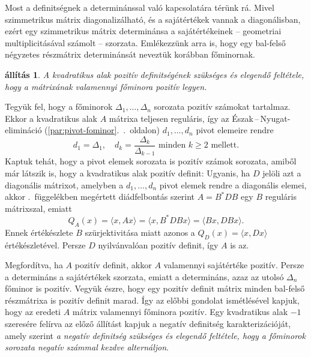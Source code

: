 \documentclass[a4paper, showtrims]{memoir}
\makeatletter
\renewenvironment{proof}[1][\proofname]
    {\par\pushQED{\qed}%
    \normalfont \topsep6\p@\@plus6\p@\relax
    \trivlist
    \item[\hskip\labelsep
        \itshape
    #1\@addpunct{:}]\ignorespaces}
    {\popQED\endtrivlist\@endpefalse}
\theoremstyle{plain}
\newtheorem{proposition}{állítás}[chapter]
\theoremstyle{remark}
\theoremstyle{definition}
\newcommand{\ip}[2]{\langle#1,#2\rangle}
\makeatother
\begin{document}
Most a definitségnek a determinánssal való kapcsolatára térünk rá.
Mivel szimmetrikus mátrix diagonalizálható, és a sajátértékek vannak a diagonálisban, ezért egy szimmetrikus mátrix determinánsa a sajátértékeinek -- geometriai multiplicitásával számolt -- szorzata.
Emlékezzünk arra is, hogy egy bal-felső négyzetes részmátrix determinánsát neveztük korábban főminornak.
\begin{proposition}
    A kvadratikus alak pozitív definitségének szükséges és elegendő feltétele,
    hogy a mátrixának valamennyi főminora pozitív legyen.
\end{proposition}
\begin{proof}
    Tegyük fel, hogy a főminorok $\Delta_1,\ldots,\Delta_n$ sorozata pozitív számokat tartalmaz.
    Ekkor a kvadratikus alak $A$ mátrixa teljesen reguláris, 
    így az Észak\,--\,Nyugat-elimináció 
    (\ref{par:pivot-fominor}.~\aazt{\pageref{par:pivot-fominor}}.~oldalon)
    $d_1,\dots,d_n$ pivot elemeire rendre
    \[
        d_1=\Delta_1,
        \quad
        d_k=\frac{\Delta_k}{\Delta_{k-1}}
        \text{ minden } k\geq 2 \text{ mellett.}
    \]
    Kaptuk tehát, hogy a pivot elemek sorozata is pozitív számok sorozata, 
    amiből már látszik is, hogy a kvadratikus alak pozitív definit:
    Ugyanis, ha $D$ jelöli azt a diagonális mátrixot, amelyben 
    a $d_1,\ldots,d_n$ pivot elemek rendre a diagonális elemei,
    akkor \aazt{\ref{apx:Kvadr}}.~függelékben megértett 
    diádfelbontás szerint $A=B^\ast DB$ egy $B$ reguláris mátrixszal,
    emiatt
    \[
        Q_A\left( x \right)=\ip{x}{Ax}=\ip{x}{B^\ast DBx}=\ip{Bx}{DBx}.
    \]
    Ennek értékészlete $B$ szürjektivitása miatt azonos a $Q_D\left( x \right)=\ip{x}{Dx}$ értékészletével.
    Persze $D$ nyilvánvalóan pozitív definit, így $A$ is az.

    Megfordítva, ha $A$ pozitív definit, akkor $A$ valamennyi sajátértéke pozitív.
    Persze a determináns a sajátértékek szorzata, emiatt a determináns,
    azaz az utolsó $\Delta_n$ főminor is pozitív.
    Vegyük észre, hogy egy pozitív definit mátrix minden bal-felső részmátrixa is pozitív definit marad.
    Így az előbbi gondolat ismétlésével kapjuk, hogy az eredeti $A$ mátrix valamennyi főminora pozitív.
\end{proof}
Egy kvadratikus alak $-1$ szeresére felírva az előző állítást kapjuk a negatív definitség karakterizációját, amely szerint 
\emph{a negatív definitség szükséges és elegendő feltétele, hogy a főminorok sorozata negatív számmal kezdve alternáljon}.
\end{document}
